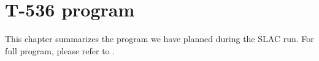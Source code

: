 \chapter{T-536 program}
\label{chap:program}

This chapter summarizes the program we have planned during the SLAC run. For full program, please refer to .
